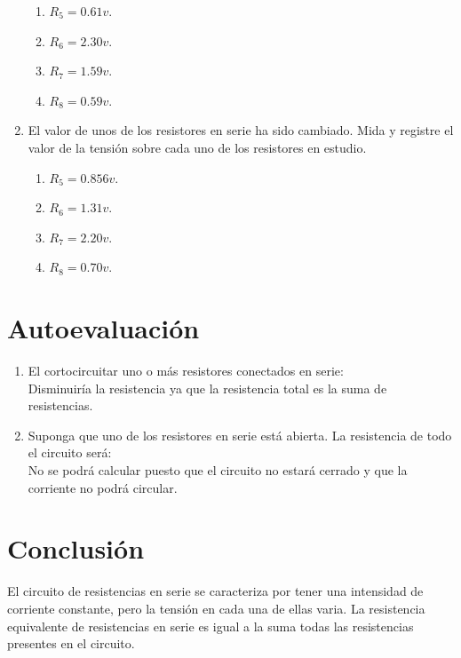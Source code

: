 \begin{enumerate}
	\begin{enumerate}
		\item $R_{5}=0.61v$.
		\item $R_{6}=2.30v$.
		\item $R_{7}=1.59v$.
		\item $R_{8}=0.59v$.
	\end{enumerate}
	\item El valor de unos de los resistores en serie ha sido cambiado. Mida y registre el valor de la tensión sobre cada uno de los resistores en estudio.
	\begin{enumerate}
		\item $R_{5}=0.856v$.
		\item $R_{6}=1.31v$.
		\item $R_{7}=2.20v$.
		\item $R_{8}=0.70v$.
	\end{enumerate}
\end{enumerate}
\section{Autoevaluación}
\begin{enumerate}
	\item El cortocircuitar uno o más resistores conectados en serie:\\
	Disminuiría la resistencia ya que la resistencia total es la suma de resistencias.
	\item Suponga que uno de los resistores en serie está abierta. La resistencia de todo el circuito será:
	\\ No se  podrá calcular puesto que el circuito no estará cerrado y que la corriente no podrá circular.	
\end{enumerate}
\section{Conclusión}
El circuito de resistencias en serie se caracteriza por tener una intensidad de corriente constante, pero la tensión en cada una de ellas varia.
La resistencia equivalente de resistencias en serie es igual a la suma todas las resistencias presentes en el circuito.
